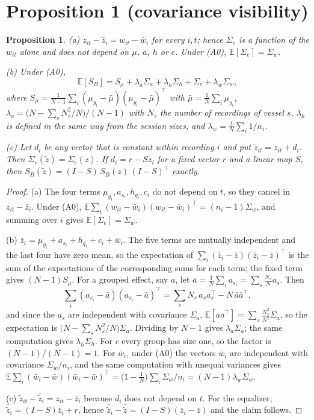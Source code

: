\documentclass[10pt]{article}
\newtheorem{proposition}{Proposition}
\newcommand{\E}{\mathbb{E}}
\begin{document}
\section{Proposition 1 (covariance visibility)}
\begin{proposition}
(a) $z_{it}-\bar z_i=w_{it}-\bar w_i$ for every $i,t$; hence $\Sigma_e$ is a function of the $w_{it}$ alone and does not depend on $\mu$, $a$, $h$ or $c$. Under (A0), $\E[\Sigma_e]=\Sigma_w$.

(b) Under (A0),
\[
\E[S_B]=S_\mu+\lambda_a\Sigma_a+\lambda_h\Sigma_h+\Sigma_c+\lambda_w\Sigma_w ,
\]
where $S_\mu=\frac1{N-1}\sum_i(\mu_{y_i}-\bar\mu)(\mu_{y_i}-\bar\mu)^{\top}$ with $\bar\mu=\frac1N\sum_i\mu_{y_i}$, $\lambda_a=\bigl(N-\sum_sN_s^2/N\bigr)/(N-1)$ with $N_s$ the number of recordings of vessel $s$, $\lambda_h$ is defined in the same way from the session sizes, and $\lambda_w=\frac1N\sum_i 1/n_i$.

(c) Let $d_i$ be any vector that is constant within recording $i$ and put $\tilde z_{it}=z_{it}+d_i$. Then $\Sigma_e(\tilde z)=\Sigma_e(z)$. If $d_i=r-S\bar z_i$ for a fixed vector $r$ and a linear map $S$, then $S_B(\tilde z)=(I-S)\,S_B(z)\,(I-S)^{\top}$ exactly.
\end{proposition}
\begin{proof}
(a) The four terms $\mu_{y_i},a_{s_i},h_{q_i},c_i$ do not depend on $t$, so they cancel in $z_{it}-\bar z_i$. Under (A0), $\E\sum_t(w_{it}-\bar w_i)(w_{it}-\bar w_i)^{\top}=(n_i-1)\Sigma_w$, and summing over $i$ gives $\E[\Sigma_e]=\Sigma_w$.

(b) $\bar z_i=\mu_{y_i}+a_{s_i}+h_{q_i}+c_i+\bar w_i$. The five terms are mutually independent and the last four have zero mean, so the expectation of $\sum_i(\bar z_i-\bar z)(\bar z_i-\bar z)^{\top}$ is the sum of the expectations of the corresponding sums for each term; the fixed term gives $(N-1)S_\mu$. For a grouped effect, say $a$, let $\bar a=\frac1N\sum_i a_{s_i}=\sum_s\frac{N_s}{N}a_s$. Then
\[
\sum_i(a_{s_i}-\bar a)(a_{s_i}-\bar a)^{\top}=\sum_sN_s\,a_sa_s^{\top}-N\,\bar a\bar a^{\top},
\]
and since the $a_s$ are independent with covariance $\Sigma_a$, $\E[\bar a\bar a^{\top}]=\sum_s\frac{N_s^2}{N^2}\Sigma_a$, so the expectation is $\bigl(N-\sum_sN_s^2/N\bigr)\Sigma_a$. Dividing by $N-1$ gives $\lambda_a\Sigma_a$; the same computation gives $\lambda_h\Sigma_h$. For $c$ every group has size one, so the factor is $(N-1)/(N-1)=1$. For $\bar w_i$, under (A0) the vectors $\bar w_i$ are independent with covariance $\Sigma_w/n_i$, and the same computation with unequal variances gives $\E\sum_i(\bar w_i-\bar w)(\bar w_i-\bar w)^{\top}=\bigl(1-\frac1N\bigr)\sum_i\Sigma_w/n_i=(N-1)\lambda_w\Sigma_w$.

(c) $\tilde z_{it}-\bar{\tilde z}_i=z_{it}-\bar z_i$ because $d_i$ does not depend on $t$. For the equalizer, $\bar{\tilde z}_i=(I-S)\bar z_i+r$, hence $\bar{\tilde z}_i-\bar{\tilde z}=(I-S)(\bar z_i-\bar z)$ and the claim follows.
\end{proof}
\end{document}
